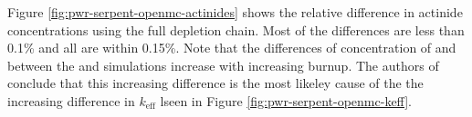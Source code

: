 Figure \ref{fig:pwr-serpent-openmc-actinides} shows the relative difference in
actinide concentrations using the full depletion chain. Most of the differences
are less than 0.1\% and all are within 0.15\%. Note that the differences of concentration of 
 and  between the \OpenMC and \SerpentTWO simulations increase
with increasing burnup. The authors of \cite{romano_depletion_2021} conclude that this
increasing difference is the most likeley cause of the the increasing difference
in $k_{\text{eff}}$ lseen in Figure \ref{fig:pwr-serpent-openmc-keff}.

\begin{figure}[htpb]
    \centering
\end{figure}
